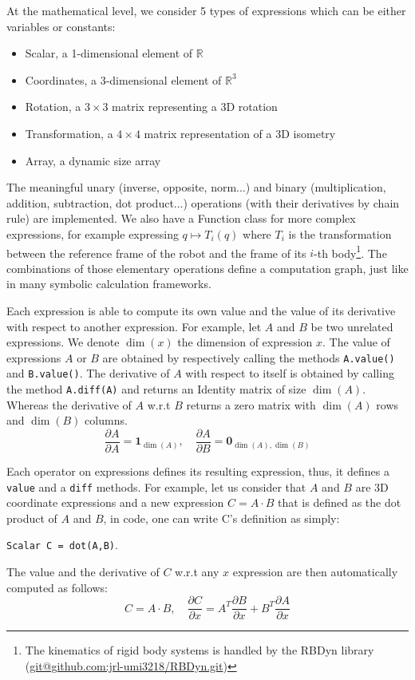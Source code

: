 At the mathematical level, we consider 5 types of expressions which can be either variables or constants:
\begin{itemize}
  \item Scalar, a 1-dimensional element of $\mathbb{R}$
  \item Coordinates, a 3-dimensional element of $\mathbb{R}^3$
  \item Rotation, a $3\times3$ matrix representing a 3D rotation
  \item Transformation, a $4\times4$ matrix representation of a 3D isometry
  \item Array, a dynamic size array
\end{itemize}
The meaningful unary (inverse, opposite, norm...) and binary (multiplication, addition, subtraction, dot product...) operations (with their derivatives by chain rule) are implemented.
We also have a Function class for more complex expressions, for example expressing $q \mapsto T_i(q)$ where $T_i$ is the transformation between the reference frame of the robot and the frame of its $i$-th body\footnote{The kinematics of rigid body systems is handled by the RBDyn library (\url{git@github.com:jrl-umi3218/RBDyn.git})}.
The combinations of those elementary operations define a computation graph, just like in many symbolic calculation frameworks.

Each expression is able to compute its own value and the value of its derivative with respect to another expression.
For example, let $A$ and $B$ be two unrelated expressions.
We denote $\dim(x)$ the dimension of expression $x$.
The value of expressions $A$ or $B$ are obtained by respectively calling the methods {\tt A.value()} and {\tt B.value()}.
The derivative of $A$ with respect to itself is obtained by calling the method {\tt A.diff(A)} and returns an Identity matrix of size $\dim(A)$.
Whereas the derivative of $A$ w.r.t $B$ returns a zero matrix with $\dim(A)$ rows and $\dim(B)$ columns.
\begin{equation}\nonumber
  \frac{\partial A}{\partial A} = \mathbf{1}_{\dim(A)}, \quad \frac{\partial A}{\partial B} = \mathbf{0}_{\dim(A),\dim(B)}
\end{equation}

Each operator on expressions defines its resulting expression, thus, it defines a {\tt value} and a {\tt diff} methods.
For example, let us consider that $A$ and $B$ are 3D coordinate expressions and a new expression $C = A\cdot B$ that is defined as the dot product of $A$ and $B$, in code, one can write C's definition as simply:
\begin{center}
{\tt Scalar C = dot(A,B)}.
\end{center}
The value and the derivative of $C$ w.r.t any $x$ expression are then automatically computed as follows:
\begin{equation}
\label{eq:dot}
  C = A\cdot B,\quad \frac{\partial C}{\partial x} = A^T\frac{\partial B}{\partial x} + B^T\frac{\partial A}{\partial x}
\end{equation}

